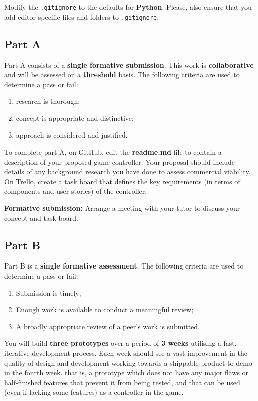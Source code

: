 \documentclass{../fal_assignment}
\begin{document}
Modify the \texttt{.gitignore} to the defaults for \textbf{Python}. Please, also ensure that you add editor-specific files and folders to \texttt{.gitignore}. 

\subsection*{Part A}

Part A consists of a \textbf{single formative submission}. This work is \textbf{collaborative} and will be assessed on a \textbf{threshold} basis. The following criteria are used to determine a pass or fail:

\begin{enumerate}[label=(\alph*)]
	\item research is thorough;
	\item concept is appropriate and distinctive;
	\item approach is considered and justified.
\end{enumerate}

To complete part A, on GitHub, edit the \textbf{readme.md} file to contain a description of your proposed game controller. Your proposal should include details of any background research you have done to assess commercial viability. On Trello, create a task board that defines the key requirements (in terms of components and user stories) of the controller. 

\textbf{Formative submission:} Arrange a meeting with your tutor to discuss your concept and task board. 

\subsection*{Part B}

Part B is a \textbf{single formative assessment}. The following criteria are used to determine a pass or fail:

\begin{enumerate}[label=(\alph*)]
	\item Submission is timely;
	\item Enough work is available to conduct a meaningful review;
	\item A broadly appropriate review of a peer's work is submitted.
\end{enumerate}

You will build \textbf{three prototypes} over a period of \textbf{3 weeks} utilising a fast, iterative development process. Each week should see a vast improvement in the quality of design and development working towards a shippable product to demo in the fourth week. that is, a prototype which does not have any major flaws or half-finished features that prevent it from being tested, and that can be used (even if lacking some features) as a controller in the game. 
\end{document}
